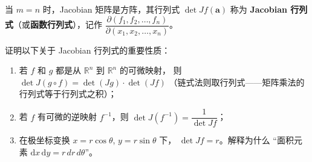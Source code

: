 \documentclass[lang=cn,11pt]{elegantbook}
\begin{document}
\begin{exercise}
当 $m=n$ 时，Jacobian 矩阵是方阵，其行列式 $\det Jf(\boldsymbol a)$ 称为
\textbf{Jacobian 行列式}（或\textbf{函数行列式}），记作
$\dfrac{\partial(f_1,f_2,\dots,f_n)}{\partial(x_1,x_2,\dots,x_n)}$。

证明以下关于 Jacobian 行列式的重要性质：
\begin{enumerate}
  \item[(1)] 若 $f$ 和 $g$ 都是从 $\mathbb R^n$ 到 $\mathbb R^n$ 的可微映射，
        则 $\det J(g\circ f)=\det(Jg)\cdot\det(Jf)$
        （链式法则取行列式——矩阵乘法的行列式等于行列式之积）；
  \item[(2)] 若 $f$ 有可微的逆映射 $f^{-1}$，则
        $\det J(f^{-1})=\dfrac{1}{\det Jf}$；
  \item[(3)] 在极坐标变换 $x=r\cos\theta$, $y=r\sin\theta$ 下，
        $\det Jf=r$。解释为什么 “面积元素 $\mathrm{d}x\,\mathrm{d}y=r\,dr\,d\theta$”。
\end{enumerate}
\end{exercise}
\end{document}
